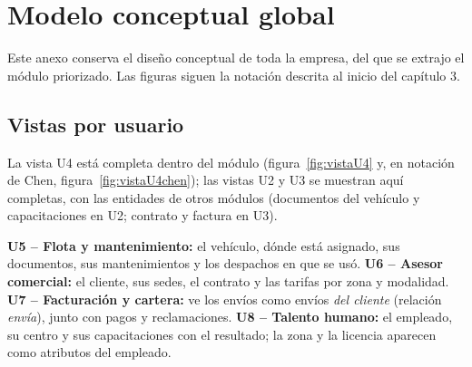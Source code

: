 
\section{Modelo conceptual global}
\label{anx:global}

Este anexo conserva el diseño conceptual de toda la empresa, del que se
extrajo el módulo priorizado. Las figuras siguen la notación descrita
al inicio del capítulo 3.

\subsection{Vistas por usuario}

La vista U4 está completa dentro del módulo (figura~\ref{fig:vistaU4}
y, en notación de Chen, figura~\ref{fig:vistaU4chen});
las vistas U2 y U3 se muestran aquí completas, con las entidades de
otros módulos (documentos del vehículo y capacitaciones en U2; contrato
y factura en U3).

\textbf{U5 -- Flota y mantenimiento:} el vehículo, dónde está asignado,
sus documentos, sus mantenimientos y los despachos en que se usó.
\textbf{U6 -- Asesor comercial:} el cliente, sus sedes, el contrato y
las tarifas por zona y modalidad. \textbf{U7 -- Facturación y cartera:}
ve los envíos como envíos \textit{del cliente} (relación
\textit{envía}), junto con pagos y reclamaciones. \textbf{U8 -- Talento
humano:} el empleado, su centro y sus capacitaciones con el resultado;
la zona y la licencia aparecen como atributos del empleado.

